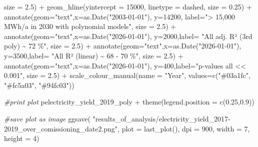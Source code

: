 \documentclass[a4paper,11pt]{article}
\newenvironment{Shaded}{\begin{snugshade}}{\end{snugshade}}
\newcommand{\AttributeTok}[1]{\textcolor[rgb]{0.77,0.63,0.00}{#1}}
\newcommand{\CommentTok}[1]{\textcolor[rgb]{0.56,0.35,0.01}{\textit{#1}}}
\newcommand{\DecValTok}[1]{\textcolor[rgb]{0.00,0.00,0.81}{#1}}
\newcommand{\FloatTok}[1]{\textcolor[rgb]{0.00,0.00,0.81}{#1}}
\newcommand{\FunctionTok}[1]{\textcolor[rgb]{0.00,0.00,0.00}{#1}}
\newcommand{\NormalTok}[1]{#1}
\newcommand{\SpecialCharTok}[1]{\textcolor[rgb]{0.00,0.00,0.00}{#1}}
\newcommand{\StringTok}[1]{\textcolor[rgb]{0.31,0.60,0.02}{#1}}
\begin{document}
\begin{Shaded}
\begin{Highlighting}[]
           \AttributeTok{size =} \FloatTok{2.5}\NormalTok{) }\SpecialCharTok{+}
  \FunctionTok{geom\_hline}\NormalTok{(}\AttributeTok{yintercept =} \DecValTok{15000}\NormalTok{, }\AttributeTok{linetype =} \StringTok{\textquotesingle{}dashed\textquotesingle{}}\NormalTok{, }\AttributeTok{size =} \FloatTok{0.25}\NormalTok{) }\SpecialCharTok{+}
  \FunctionTok{annotate}\NormalTok{(}\AttributeTok{geom=}\StringTok{"text"}\NormalTok{,}\AttributeTok{x=}\FunctionTok{as.Date}\NormalTok{(}\StringTok{"2003{-}01{-}01"}\NormalTok{),}
           \AttributeTok{y=}\DecValTok{14200}\NormalTok{, }\AttributeTok{label=}\StringTok{"\textgreater{} 15,000 MWh/a in 2030 with polynomial models"}\NormalTok{, }
           \AttributeTok{size =} \FloatTok{2.5}\NormalTok{) }\SpecialCharTok{+}
  \FunctionTok{annotate}\NormalTok{(}\AttributeTok{geom=}\StringTok{"text"}\NormalTok{,}\AttributeTok{x=}\FunctionTok{as.Date}\NormalTok{(}\StringTok{"2026{-}01{-}01"}\NormalTok{),}
           \AttributeTok{y=}\DecValTok{2000}\NormalTok{,}\AttributeTok{label=} \StringTok{"All adj. R² (3rd poly) \textasciitilde{} 72 \%"}\NormalTok{, }\AttributeTok{size =} \FloatTok{2.5}\NormalTok{) }\SpecialCharTok{+}
  \FunctionTok{annotate}\NormalTok{(}\AttributeTok{geom=}\StringTok{"text"}\NormalTok{,}\AttributeTok{x=}\FunctionTok{as.Date}\NormalTok{(}\StringTok{"2026{-}01{-}01"}\NormalTok{),}
           \AttributeTok{y=}\DecValTok{3500}\NormalTok{,}\AttributeTok{label=} \StringTok{"All R² (linear) \textasciitilde{} 68 {-} 70 \%"}\NormalTok{, }\AttributeTok{size =} \FloatTok{2.5}\NormalTok{) }\SpecialCharTok{+}
  \FunctionTok{annotate}\NormalTok{(}\AttributeTok{geom=}\StringTok{"text"}\NormalTok{,}\AttributeTok{x=}\FunctionTok{as.Date}\NormalTok{(}\StringTok{"2026{-}01{-}01"}\NormalTok{),}
           \AttributeTok{y=}\DecValTok{400}\NormalTok{,}\AttributeTok{label=}\StringTok{"p{-}values all \textless{}\textless{} 0.001"}\NormalTok{, }\AttributeTok{size =} \FloatTok{2.5}\NormalTok{) }\SpecialCharTok{+}
  \FunctionTok{scale\_colour\_manual}\NormalTok{(}\AttributeTok{name =} \StringTok{"Year"}\NormalTok{, }\AttributeTok{values=}\FunctionTok{c}\NormalTok{(}\StringTok{"\#03a1fc"}\NormalTok{, }\StringTok{"\#fc5a03"}\NormalTok{, }\StringTok{"\#94fc03"}\NormalTok{)) }

\CommentTok{\#print plot}
\NormalTok{pelectricity\_yield\_2019\_poly }\SpecialCharTok{+}  \FunctionTok{theme}\NormalTok{(}\AttributeTok{legend.position =} \FunctionTok{c}\NormalTok{(}\FloatTok{0.25}\NormalTok{,}\FloatTok{0.9}\NormalTok{))}

\CommentTok{\#save plot as image}
\FunctionTok{ggsave}\NormalTok{(}
  \StringTok{"results\_of\_analysis/electricity\_yield\_2017{-}2019\_over\_comissioning\_date2.png"}\NormalTok{,}
       \AttributeTok{plot =} \FunctionTok{last\_plot}\NormalTok{(),}
       \AttributeTok{dpi =} \DecValTok{900}\NormalTok{,}
       \AttributeTok{width =} \DecValTok{7}\NormalTok{,}
       \AttributeTok{height =} \DecValTok{4}\NormalTok{)}


\end{Highlighting}
\end{Shaded}
\end{document}
